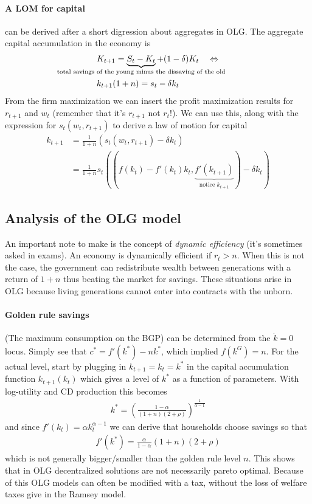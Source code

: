 \documentclass[12pt, a4paper]{article}
\begin{document}
\begin{spacing}{1.213}
\paragraph{A LOM for capital} can be derived after a short digression about aggregates in OLG. The aggregate capital accumulation in the economy is
\begin{align*}
&K_{t+1} = \underbrace{S_t -K_t}_{\mathclap{\textrm{total savings of the young minus the dissaving of the old}}} + (1-\delta)K_t && \Leftrightarrow \\
& k_{t+1}(1+n) = s_t - \delta k_t
\end{align*}
From the firm maximization we can insert the profit maximization results for $r_{t+1}$ and $w_t$ (remember that it's $r_{t+1}$ not $r_t$!). We can use this, along with the expression for $s_t(w_t, r_{t+1})$ to derive a law of motion for capital
\begin{align*}
k_{t+1} &= \frac{1}{1+n} (s_t(w_t, r_{t+1}) - \delta k_t ) \\
& = \frac{1}{1+n} s_t((f(k_t)-f'(k_t)k_t, \underbrace{f'(k_{t+1})}_{\textrm{notice }k_{t+1}} ) - \delta k_t )
\end{align*}

\subsection{Analysis of the OLG model}
An important note to make is the concept of \textit{dynamic efficiency} (it's sometimes asked in exams). An economy is dynamically efficient if $r_t >n$. When this is not the case, the government can redistribute wealth between generations with a return of $1+n$ thus beating the market for savings. These situations arise in OLG because living generations cannot enter into contracts with the unborn.
\paragraph{Golden rule savings} (The maximum consumption on the BGP) can be determined from the $\dot{k}=0$ locus. Simply see that $c^* = f'(k^*)-nk^*$, which implied $f(k^G) = n$. For the actual level, start by plugging in $k_{t+1} = k_t = k^*$ in the capital accumulation function $k_{t+1} (k_t)$ which gives a level of $k^*$ as a function of parameters. With log-utility and CD production this becomes
\begin{align*}
k^* = \left(\frac{1-\alpha}{(1+n)(2+ \rho)}\right)^{\frac{1}{\alpha-1}}
\end{align*}
and since $f'(k_t) = \alpha k_t ^{\alpha-1}$ we can derive that households choose savings so that
\begin{align*}
f'(k^*) = \frac{\alpha}{1-\alpha}(1+n)(2+\rho)
\end{align*}
which is not generally bigger/smaller than the golden rule level $n$. This shows that in OLG decentralized solutions are not necessarily pareto optimal. Because of this OLG models can often be modified with a tax, without the loss of welfare taxes give in the Ramsey model.



\end{spacing}
\end{document}
